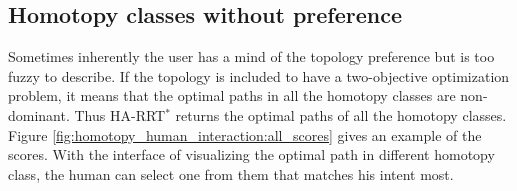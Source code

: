 \documentclass[letterpaper, 10 pt, conference]{ieeeconf}
\begin{document}
\subsection{Homotopy classes without preference}
\label{sec:without_preference}

Sometimes inherently the user has a mind of the topology preference but is too fuzzy to describe.
If the topology is included to have a two-objective optimization problem, it means that the optimal paths in all the homotopy classes are non-dominant.
Thus HA-RRT$^{*}$ returns the optimal paths of all the homotopy classes.
Figure \ref{fig:homotopy_human_interaction:all_scores} gives an example of the scores.
With the interface of visualizing the optimal path in different homotopy class, the human can select one from them that matches his intent most.
\end{document}
